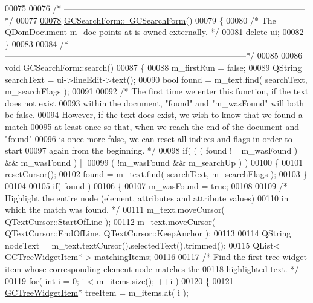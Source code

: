\begin{DoxyCode}
00075 
00076 \textcolor{comment}{/*
      --------------------------------------------------------------------------------------*/}
00077 
\hypertarget{gcsearchform_8cpp_source_l00078}{}\hyperlink{class_g_c_search_form_a27023a33b05baafe5d41cfb738985688}{00078} \hyperlink{class_g_c_search_form_a27023a33b05baafe5d41cfb738985688}{GCSearchForm::~GCSearchForm}()
00079 \{
00080   \textcolor{comment}{/* The QDomDocument m\_doc points at is owned externally. */}
00081   \textcolor{keyword}{delete} ui;
00082 \}
00083 
00084 \textcolor{comment}{/*
      --------------------------------------------------------------------------------------*/}
00085 
00086 \textcolor{keywordtype}{void} GCSearchForm::search()
00087 \{
00088   m\_firstRun = \textcolor{keyword}{false};
00089   QString searchText = ui->lineEdit->text();
00090   \textcolor{keywordtype}{bool} found = m\_text.find( searchText, m\_searchFlags );
00091 
00092   \textcolor{comment}{/* The first time we enter this function, if the text does not exist}
00093 \textcolor{comment}{    within the document, "found" and "m\_wasFound" will both be false.}
00094 \textcolor{comment}{    However, if the text does exist, we wish to know that we found a match}
00095 \textcolor{comment}{    at least once so that, when we reach the end of the document and "found"}
00096 \textcolor{comment}{    is once more false, we can reset all indices and flags in order to start}
00097 \textcolor{comment}{    again from the beginning. */}
00098   \textcolor{keywordflow}{if}( ( ( found != m\_wasFound ) && m\_wasFound ) ||
00099       ( !m\_wasFound && m\_searchUp ) )
00100   \{
00101     resetCursor();
00102     found = m\_text.find( searchText, m\_searchFlags );
00103   \}
00104 
00105   \textcolor{keywordflow}{if}( found )
00106   \{
00107     m\_wasFound = \textcolor{keyword}{true};
00108 
00109     \textcolor{comment}{/* Highlight the entire node (element, attributes and attribute values) }
00110 \textcolor{comment}{      in which the match was found. */}
00111     m\_text.moveCursor( QTextCursor::StartOfLine );
00112     m\_text.moveCursor( QTextCursor::EndOfLine, QTextCursor::KeepAnchor );
00113 
00114     QString nodeText = m\_text.textCursor().selectedText().trimmed();
00115     QList< GCTreeWidgetItem* > matchingItems;
00116 
00117     \textcolor{comment}{/* Find the first tree widget item whose corresponding element node matches
       the}
00118 \textcolor{comment}{      highlighted text. */}
00119     \textcolor{keywordflow}{for}( \textcolor{keywordtype}{int} i = 0; i < m\_items.size(); ++i )
00120     \{
00121       \hyperlink{class_g_c_tree_widget_item}{GCTreeWidgetItem}* treeItem = m\_items.at( i );

\end{DoxyCode}
